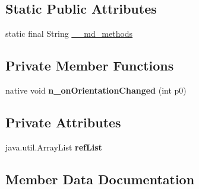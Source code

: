 \subsection*{Static Public Attributes}
\begin{DoxyCompactItemize}
\item 
static final String \hyperlink{classmd59e336b20c5f59a4196ec0611a339f132_1_1OrientationListener_adc10bb7086f337037c513e393abc293f}{\+\_\+\+\_\+md\+\_\+methods}
\end{DoxyCompactItemize}
\subsection*{Private Member Functions}
\begin{DoxyCompactItemize}
\item 
\mbox{\label{classmd59e336b20c5f59a4196ec0611a339f132_1_1OrientationListener_a1adbccecd9ec0ef11ab00ccdcd672fe5}} 
native void {\bfseries n\+\_\+on\+Orientation\+Changed} (int p0)
\end{DoxyCompactItemize}
\subsection*{Private Attributes}
\begin{DoxyCompactItemize}
\item 
\mbox{\label{classmd59e336b20c5f59a4196ec0611a339f132_1_1OrientationListener_abb73c318cf36f57e06cc3cab8b720b88}} 
java.\+util.\+Array\+List {\bfseries ref\+List}
\end{DoxyCompactItemize}


\subsection{Member Data Documentation}
\mbox{\label{classmd59e336b20c5f59a4196ec0611a339f132_1_1OrientationListener_adc10bb7086f337037c513e393abc293f}} 
